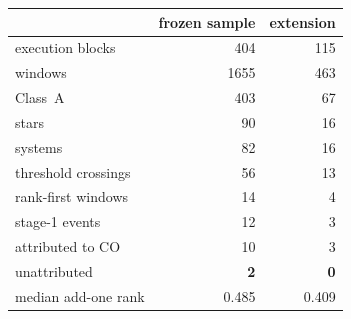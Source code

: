 \begin{tabular}{@{}lrr@{}}
\toprule
 & frozen sample & extension \\
\midrule
execution blocks & 404 & 115 \\
windows & 1655 & 463 \\
\quad Class~A & 403 & 67 \\
stars & 90 & 16 \\
systems & 82 & 16 \\
\midrule
threshold crossings & 56 & 13 \\
rank-first windows & 14 & 4 \\
stage-1 events & 12 & 3 \\
\quad attributed to CO & 10 & 3 \\
\quad unattributed & \textbf{2} & \textbf{0} \\
\midrule
median add-one rank & 0.485 & 0.409 \\
\bottomrule
\end{tabular}
